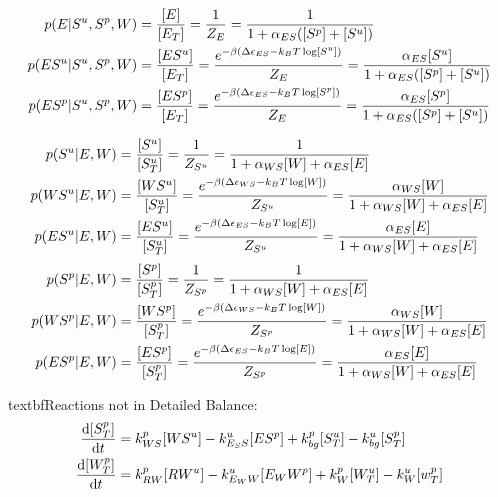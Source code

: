 \documentclass[aps,onecolumn,superscriptaddress,notitlepage]{revtex4-1}
\begin{document}
\begin{align}
p(E|S^u,S^p, W) &= \frac{[E]}{[E_T]} = \frac{1}{Z_E} =  \frac{1}{1 + \alpha_{ES}([S^p]+[S^u])}\\
p(ES^u|S^u,S^p, W) &= \frac{[ES^u]}{[E_T]}  = \frac{e^{-\beta\qty(\Delta\epsilon_{ES} -k_BT \log[S^u])}}{Z_E} =  \frac{\alpha_{ES}[S^u]}{1 + \alpha_{ES}([S^p]+[S^u])}\\
p(ES^p|S^u,S^p, W) &= \frac{[ES^p]}{[E_T]}  = \frac{e^{-\beta\qty(\Delta\epsilon_{ES} -k_BT \log[S^p])}}{Z_E} =  \frac{\alpha_{ES}[S^p]}{1 + \alpha_{ES}([S^p]+[S^u])}
\end{align}

\begin{align}
p(S^u|E, W) &= \frac{[S^u]}{[S^u_T]} = \frac{1}{Z_{S^u}} = \frac{1}{1 + \alpha_{WS}[W]+ \alpha_{ES}[E]}\\
p(WS^u|E, W) &= \frac{[WS^u]}{[S^u_T]} = \frac{ e^{-\beta\qty(\Delta\epsilon_{WS} -k_BT \log[W])}}{Z_{S^u}} = \frac{\alpha_{WS}[W]}{1 + \alpha_{WS}[W]+ \alpha_{ES}[E]}\\
p(ES^u|E, W) &= \frac{[ES^u]}{[S^u_T]} = \frac{ e^{-\beta\qty(\Delta\epsilon_{ES} -k_BT \log[E])}}{Z_{S^u}} = \frac{\alpha_{ES}[E]}{1 + \alpha_{WS}[W]+ \alpha_{ES}[E]}
\end{align}
\begin{align}
p(S^p|E, W) &= \frac{[S^p]}{[S^p_T]} = \frac{1}{Z_{S^p}} = \frac{1}{1 + \alpha_{WS}[W]+ \alpha_{ES}[E]}\\
p(WS^p|E, W) &= \frac{[WS^p]}{[S^p_T]} = \frac{ e^{-\beta\qty(\Delta\epsilon_{WS} -k_BT \log[W])}}{Z_{S^p}} = \frac{\alpha_{WS}[W]}{1 + \alpha_{WS}[W]+ \alpha_{ES}[E]}\\
p(ES^p|E, W) &= \frac{[ES^p]}{[S^p_T]} = \frac{ e^{-\beta\qty(\Delta\epsilon_{ES} -k_BT \log[E])}}{Z_{S^p}} = \frac{\alpha_{ES}[E]}{1 + \alpha_{WS}[W]+ \alpha_{ES}[E]}
\end{align}


textbf{Reactions not in  Detailed Balance:}
\begin{align}
\dv{[S^p_T]}{t} &= k_{WS}^p[WS^u] - k_{E_SS}^u[ES^p] + k_{bg}^p[S^u_T] - k_{bg}^u[S^p_T]\\
\dv{[W^p_T]}{t} &= k_{RW}^p[RW^u] - k_{E_WW}^u[E_WW^p] + k_W^p[W^u_T] - k_W^u[w^p_T]
\end{align}


\end{document}
